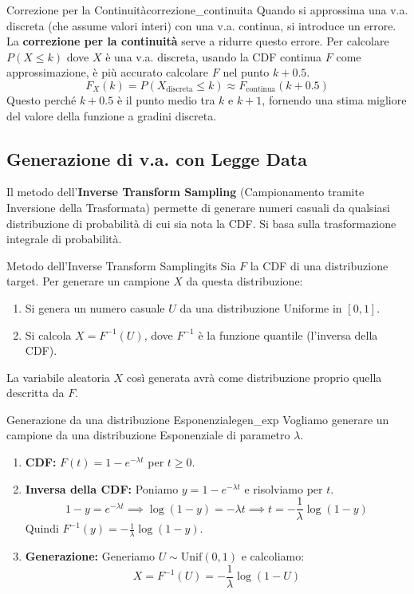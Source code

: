 \begin{nota}{Correzione per la Continuità}{correzione_continuita}
Quando si approssima una v.a. discreta (che assume valori interi) con una v.a. continua, si introduce un errore. La \textbf{correzione per la continuità} serve a ridurre questo errore.
Per calcolare \( P(X \le k) \) dove \( X \) è una v.a. discreta, usando la CDF continua \( F \) come approssimazione, è più accurato calcolare \( F \) nel punto \( k+0.5 \).
\[
F_X(k) = P(X_{\text{discreta}} \le k) \approx F_{\text{continua}}(k + 0.5)
\]
Questo perché \( k+0.5 \) è il punto medio tra \(k\) e \(k+1\), fornendo una stima migliore del valore della funzione a gradini discreta.
\end{nota}

\subsection{Generazione di v.a. con Legge Data}\label{ssec:generazione_va}
Il metodo dell'\textbf{Inverse Transform Sampling} (Campionamento tramite Inversione della Trasformata) permette di generare numeri casuali da qualsiasi distribuzione di probabilità di cui sia nota la CDF. Si basa sulla trasformazione integrale di probabilità.

\begin{proposizione}{Metodo dell'Inverse Transform Sampling}{its}
Sia \( F \) la CDF di una distribuzione target. Per generare un campione \( X \) da questa distribuzione:
\begin{enumerate}
    \item Si genera un numero casuale \( U \) da una distribuzione Uniforme in \( [0, 1] \).
    \item Si calcola \( X = F^{-1}(U) \), dove \( F^{-1} \) è la funzione quantile (l'inversa della CDF).
\end{enumerate}
La variabile aleatoria \( X \) così generata avrà come distribuzione proprio quella descritta da \( F \).
\end{proposizione}

\begin{esempio}{Generazione da una distribuzione Esponenziale}{gen_exp}
Vogliamo generare un campione da una distribuzione Esponenziale di parametro \( \lambda \).
\begin{enumerate}
    \item \textbf{CDF:} \( F(t) = 1 - e^{-\lambda t} \) per \( t \ge 0 \).
    \item \textbf{Inversa della CDF:} Poniamo \( y = 1 - e^{-\lambda t} \) e risolviamo per \( t \).
    \[
    1-y = e^{-\lambda t} \implies \log(1-y) = -\lambda t \implies t = -\frac{1}{\lambda}\log(1-y)
    \]
    Quindi \( F^{-1}(y) = -\frac{1}{\lambda}\log(1-y) \).
    \item \textbf{Generazione:} Generiamo \( U \sim \text{Unif}(0,1) \) e calcoliamo:
    \[
    X = F^{-1}(U) = -\frac{1}{\lambda}\log(1-U)
    \]
\end{enumerate}
\end{esempio}

